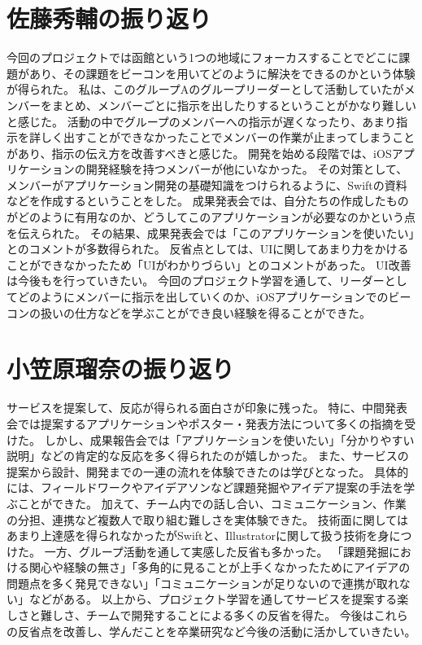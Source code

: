 \documentclass[openany,11pt,papersize]{jsbook}
\begin{document}
\section{佐藤秀輔の振り返り}
今回のプロジェクトでは函館という1つの地域にフォーカスすることでどこに課題があり、その課題をビーコンを用いてどのように解決をできるのかという体験が得られた。
私は、このグループAのグループリーダーとして活動していたがメンバーをまとめ、メンバーごとに指示を出したりするということがかなり難しいと感じた。
活動の中でグループのメンバーへの指示が遅くなったり、あまり指示を詳しく出すことができなかったことでメンバーの作業が止まってしまうことがあり、指示の伝え方を改善すべきと感じた。
開発を始める段階では、iOSアプリケーションの開発経験を持つメンバーが他にいなかった。
その対策として、メンバーがアプリケーション開発の基礎知識をつけられるように、Swiftの資料などを作成するということをした。
成果発表会では、自分たちの作成したものがどのように有用なのか、どうしてこのアプリケーションが必要なのかという点を伝えられた。
その結果、成果発表会では「このアプリケーションを使いたい」とのコメントが多数得られた。
反省点としては、UIに関してあまり力をかけることができなかったため「UIがわかりづらい」とのコメントがあった。
UI改善は今後もを行っていきたい。
今回のプロジェクト学習を通して、リーダーとしてどのようにメンバーに指示を出していくのか、iOSアプリケーションでのビーコンの扱いの仕方などを学ぶことができ良い経験を得ることができた。


\section{小笠原瑠奈の振り返り}
サービスを提案して、反応が得られる面白さが印象に残った。
特に、中間発表会では提案するアプリケーションやポスター・発表方法について多くの指摘を受けた。
しかし、成果報告会では「アプリケーションを使いたい」「分かりやすい説明」などの肯定的な反応を多く得られたのが嬉しかった。
また、サービスの提案から設計、開発までの一連の流れを体験できたのは学びとなった。
具体的には、フィールドワークやアイデアソンなど課題発掘やアイデア提案の手法を学ぶことができた。
加えて、チーム内での話し合い、コミュニケーション、作業の分担、連携など複数人で取り組む難しさを実体験できた。
技術面に関してはあまり上達感を得られなかったがSwiftと、Illustratorに関して扱う技術を身につけた。
一方、グループ活動を通して実感した反省も多かった。
「課題発掘における関心や経験の無さ」「多角的に見ることが上手くなかったためにアイデアの問題点を多く発見できない」「コミュニケーションが足りないので連携が取れない」などがある。
以上から、プロジェクト学習を通してサービスを提案する楽しさと難しさ、チームで開発することによる多くの反省を得た。
今後はこれらの反省点を改善し、学んだことを卒業研究など今後の活動に活かしていきたい。
\end{document}
